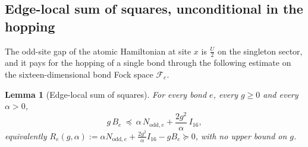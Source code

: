 \documentclass[11pt]{article}
\theoremstyle{plain}
\newtheorem{lemma}{Lemma}
\theoremstyle{definition}
\begin{document}
\subsection{Edge-local sum of squares, unconditional in the hopping}

The odd-site gap of the atomic Hamiltonian at site $x$ is $\frac U2$ on the
singleton sector, and it pays for the hopping of a single bond through the
following estimate on the sixteen-dimensional bond Fock space $\mathcal F_e$.

\begin{lemma}[Edge-local sum of squares]\label{lem:sos}
For every bond $e$, every $g\ge0$ and every $\alpha>0$,
\begin{equation}\label{eq:localform}
 g\,B_e\ \preceq\ \alpha\,N_{\mathrm{odd},e}+\frac{2g^2}{\alpha}\,I_{16},
\end{equation}
equivalently $R_e(g,\alpha):=\alpha N_{\mathrm{odd},e}+\frac{2g^2}{\alpha}I_{16}-gB_e
\succeq0$, with no upper bound on $g$.
\end{lemma}
\end{document}
